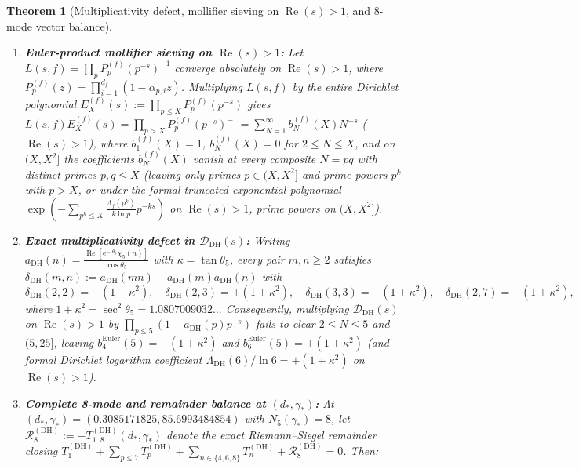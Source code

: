\documentclass[11pt,reqno]{amsart}
\newtheorem{theorem}{Theorem}[section]
\theoremstyle{definition}
\theoremstyle{remark}
\numberwithin{equation}{section}
\newcommand{\ii}{\mathrm{i}}
\newcommand{\ee}{\mathrm{e}}
\DeclareMathOperator{\Reop}{Re}
\begin{document}
\begin{theorem}[Multiplicativity defect, mollifier sieving on $\Reop(s)>1$, and 8-mode vector balance]
\label{thm:prime-gauge-breakdown}
\leavevmode
\begin{enumerate}[label=\textup{(\roman*)},leftmargin=2.2em]
  \item \textbf{Euler-product mollifier sieving on $\Reop(s) > 1$:} Let $L(s,f) = \prod_p P_p^{(f)}(p^{-s})^{-1}$ converge absolutely on $\Reop(s) > 1$, where $P_p^{(f)}(z) = \prod_{i=1}^{d_f}(1 - \alpha_{p,i}z)$. Multiplying $L(s,f)$ by the entire Dirichlet polynomial $E_X^{(f)}(s) := \prod_{p \le X} P_p^{(f)}(p^{-s})$ gives $L(s,f)E_X^{(f)}(s) = \prod_{p>X} P_p^{(f)}(p^{-s})^{-1} = \sum_{N=1}^{\infty} b_N^{(f)}(X)N^{-s}$ ($\Reop(s) > 1$), where $b_1^{(f)}(X) = 1$, $b_N^{(f)}(X) = 0$ for $2 \le N \le X$, and on $(X,X^2]$ the coefficients $b_N^{(f)}(X)$ vanish at every composite $N = pq$ with distinct primes $p,q \le X$ (leaving only primes $p \in (X,X^2]$ and prime powers $p^k$ with $p > X$, or under the formal truncated exponential polynomial $\exp(-\sum_{p^k \le X} \frac{\Lambda_f(p^k)}{k\ln p}p^{-ks})$ on $\Reop(s)>1$, prime powers on $(X,X^2]$).
  \item \textbf{Exact multiplicativity defect in $\mathcal{D}_{\mathrm{DH}}(s)$:} Writing $a_{\mathrm{DH}}(n) = \frac{\Reop[\ee^{-\ii\theta_5}\chi_5(n)]}{\cos\theta_5}$ with $\kappa = \tan\theta_5$, every pair $m,n \ge 2$ satisfies $\delta_{\mathrm{DH}}(m,n) := a_{\mathrm{DH}}(mn) - a_{\mathrm{DH}}(m)a_{\mathrm{DH}}(n)$ with
  \begin{equation}
    \delta_{\mathrm{DH}}(2,2) = -(1 + \kappa^2), \quad
    \delta_{\mathrm{DH}}(2,3) = +(1 + \kappa^2), \quad
    \delta_{\mathrm{DH}}(3,3) = -(1 + \kappa^2), \quad
    \delta_{\mathrm{DH}}(2,7) = -(1 + \kappa^2),
    \label{eq:exact-dh-defects}
  \end{equation}
  where $1 + \kappa^2 = \sec^2\theta_5 = 1.0807009032\ldots$ Consequently, multiplying $\mathcal{D}_{\mathrm{DH}}(s)$ on $\Reop(s)>1$ by $\prod_{p\le 5}(1 - a_{\mathrm{DH}}(p)p^{-s})$ fails to clear $2\le N\le 5$ and $(5,25]$, leaving $b_4^{\mathrm{Euler}}(5) = -(1+\kappa^2)$ and $b_6^{\mathrm{Euler}}(5) = +(1+\kappa^2)$ (and formal Dirichlet logarithm coefficient $\Lambda_{\mathrm{DH}}(6)/\ln 6 = +(1+\kappa^2)$ on $\Reop(s) > 1$).
  \item \textbf{Complete 8-mode and remainder balance at $(d_*,\gamma_*)$:} At $(d_*,\gamma_*) = (0.3085171825,\allowbreak 85.6993484854)$ with $N_5(\gamma_*) = 8$, let $\mathcal{R}_8^{(\mathrm{DH})} := -T_{1..8}^{(\mathrm{DH})}(d_*,\gamma_*)$ denote the exact Riemann--Siegel remainder closing $T_1^{(\mathrm{DH})} + \sum_{p\le 7} T_p^{(\mathrm{DH})} + \sum_{n\in\{4,6,8\}} T_n^{(\mathrm{DH})} + \mathcal{R}_8^{(\mathrm{DH})} = 0$. Then:

\end{enumerate}
\end{theorem}
\end{document}
